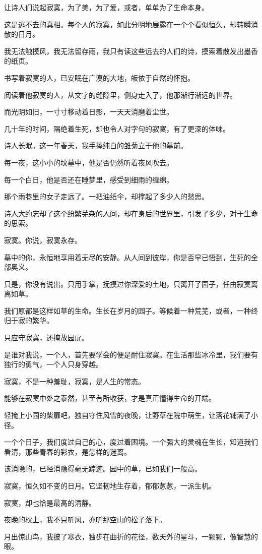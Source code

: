 \documentclass[12pt,a4paper]{article}
\def\blankrev{\vspace{1ex}}									%
\begin{document}
		\blankrev
		让诗人们说起寂寞，为了美，为了爱，或者，单单为了生命本身。\par
		这是逃不去的真相。每个人的寂寞，如此分明地展露在一个个看似恒久，却转瞬消散的日月。\par
		我无法触摸风，我无法留存雨，我只有读这些远去的人们的诗，摸索着散发出墨香的纸页。\par
		书写着寂寞的人，已安眠在广漠的大地，皈依于自然的怀抱。\par
		阅读着他寂寞的人，从文字的缝隙里，侧身走入了，他那渐行渐远的世界。\par
		而光阴如旧，一寸寸移动着日影，一天天消磨着尘世。\par
		几十年的时间，隔绝着生死，却也令人对字句的寂寞，有了更深的体味。\par
		诗人长眠。这一年春天，我手捧纯白的雏菊立于他的墓前。\par
		每一夜，这小小的坟墓中，他是否仍然听着夜风吹去。\par
		每一个白日，他是否还在睡梦里，感受到细雨的缠绵。\par
		那个雨巷里的女子走远了。一把油纸伞，却撑起了多少人的愁思。\par
		诗人大约忘却了这个纷繁芜杂的人间，却在身后的世界里，引发了多少，对于生命的思索。\par
		寂寞。你说，寂寞永存。\par
		墓中的你，永恒地享用着无尽的安静。从人间到彼岸，你是否早已悟到，生死的全部奥义。\par
		只是，你没有说出。只用手掌，抚摸过你深爱的土地，只离开了园子，任由寂寞离离如草。

		\blankrev
		我们原都是这样如草的生命。生长在岁月的园子。等候着一种荒芜，或者，一种终归于寂的繁华。\par
		只应守寂寞，还掩故园扉。\par
		是谁对我说，一个人，首先要学会的便是耐住寂寞。在生活那些冰冷里，我们要有独行的勇气，一个人只身穿越。\par
		寂寞，不是一种羞耻，寂寞，是人生的常态。\par
		能够在寂寞中处之泰然，甚至有所收获，才是真正懂得生命的开端。\par
		轻掩上小园的柴扉吧，独自守住风雪的夜晚，让野草在院中萌生，让落花铺满了小径。\par
		一个个日子，我们度过自己的心，度过着困境。一个强大的灵魂在生长，知道我们看清，那些青春的彩衣，是怎样的迷离。\par
		该消隐的，已经消隐得毫无踪迹。园中的草，已如我们一般高。\par
		寂寞，恒久如不变的日月。它坚韧地生存着，郁郁葱葱，一派生机。\par
		寂寞，却也恰是最高的清静。\par
		夜晚的枕上，我不只听风，亦听那空山的松子落下。\par
		月出惊山鸟，我披了寒衣，独步在曲折的花径，数天外的星斗，一颗颗，像智慧的眼。
\end{document}
